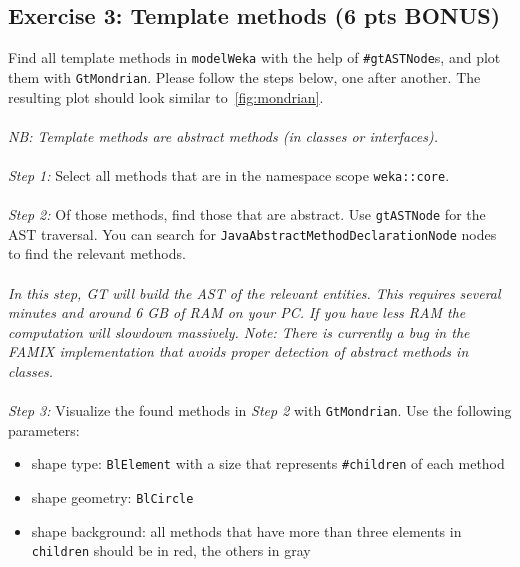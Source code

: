 \documentclass [11pt, a4wide, twoside]{article}
\begin{document}
\subsection*{Exercise 3: Template methods (6 pts BONUS)}
Find all template methods in \texttt{modelWeka} with the help of \texttt{\#gtASTNode}s, and plot them with \texttt{GtMondrian}. Please follow the steps below, one after another. The resulting plot should look similar to~\autoref{fig:mondrian}.\\\\
\emph{NB: Template methods are abstract methods (in classes or interfaces).}\\\\
\emph{Step 1:}
Select all methods that are in the namespace scope \texttt{weka::core}.\\\\
\emph{Step 2:}
Of those methods, find those that are abstract. Use \texttt{gtASTNode} for the AST traversal. You can search for \texttt{JavaAbstractMethodDeclarationNode} nodes to find the relevant methods.\\\\
\emph{In this step, GT will build the AST of the relevant entities. This requires several minutes and around 6 GB of RAM on your PC. If you have less RAM the computation will slowdown massively. Note: There is currently a bug in the FAMIX implementation that avoids proper detection of abstract methods in classes.}\\\\
\emph{Step 3:}
Visualize the found methods in \emph{Step 2} with \texttt{GtMondrian}. Use the following parameters:
\begin{itemize}
\item shape type: \texttt{BlElement} with a size that represents \texttt{\#children} of each method
\item shape geometry: \texttt{BlCircle}
\item shape background: all methods that have more than three elements in \texttt{children} should be in red, the others in gray
\end{itemize}
\end{document}
